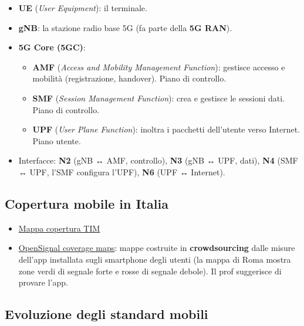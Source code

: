 \begin{itemize}
\tightlist
\item
  \textbf{UE} (\emph{User Equipment}): il terminale.
\item
  \textbf{gNB}: la stazione radio base 5G (fa parte della \textbf{5G RAN}).
\item
  \textbf{5G Core (5GC)}:

  \begin{itemize}
  \tightlist
  \item
    \textbf{AMF} (\emph{Access and Mobility Management Function}): gestisce accesso e mobilità (registrazione, handover). Piano di controllo.
  \item
    \textbf{SMF} (\emph{Session Management Function}): crea e gestisce le sessioni dati. Piano di controllo.
  \item
    \textbf{UPF} (\emph{User Plane Function}): inoltra i pacchetti dell'utente verso Internet. Piano utente.
  \end{itemize}
\item
  Interfacce: \textbf{N2} (gNB ↔ AMF, controllo), \textbf{N3} (gNB ↔ UPF, dati), \textbf{N4} (SMF ↔ UPF, l'SMF configura l'UPF), \textbf{N6} (UPF ↔ Internet).
\end{itemize}

\subsection{Copertura mobile in Italia}

\begin{itemize}
\tightlist
\item
  \href{https://www.tim.it/fisso-e-mobile/mobile/mappa-copertura-mobile}{Mappa copertura TIM}
\item
  \href{https://www.opensignal.com/coverage-maps}{OpenSignal coverage maps}: mappe costruite in \textbf{crowdsourcing} dalle misure dell'app installata sugli smartphone degli utenti (la mappa di Roma mostra zone verdi di segnale forte e rosse di segnale debole). Il prof suggerisce di provare l'app.
\end{itemize}

\subsection{Evoluzione degli standard mobili}

